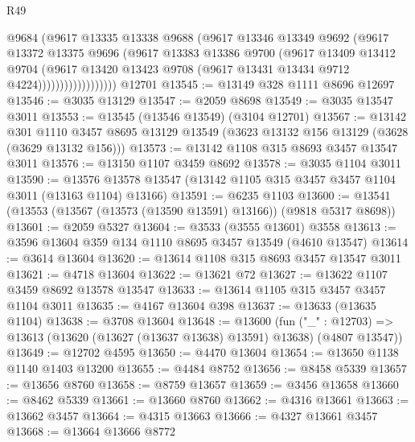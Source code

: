 \begin{lexlean}{R49}
\begin{coremodule}
                          @9684
                          (@9617
                            @13335
                            @13338
                            @9688
                            (@9617
                              @13346
                              @13349
                              @9692
                              (@9617
                                @13372
                                @13375
                                @9696
                                (@9617
                                  @13383
                                  @13386
                                  @9700
                                  (@9617
                                    @13409
                                    @13412
                                    @9704
                                    (@9617
                                      @13420
                                      @13423
                                      @9708
                                      (@9617 @13431 @13434 @9712 @4224))))))))))))))))))
    @12701
@13545 := @13149 @328 @1111 @8696 @12697
@13546 := @3035 @13129
@13547 := @2059 @8698
@13549 := @3035 @13547 @3011
@13553 := @13545 (@13546 @13549) (@3104 @12701)
@13567 := @13142
    @301
    @1110
    @3457
    @8695
    @13129
    @13549
    (@3623 @13132 @156 @13129 (@3628 (@3629 @13132 @156)))
@13573 := @13142 @1108 @315 @8693 @3457 @13547 @3011
@13576 := @13150 @1107 @3459 @8692
@13578 := @3035 @1104 @3011
@13590 := @13576 @13578 @13547 (@13142 @1105 @315 @3457 @3457 @1104 @3011 (@13163 @1104) @13166)
@13591 := @6235 @1103
@13600 := @13541 (@13553 (@13567 (@13573 (@13590 @13591) @13166)) (@9818 @5317 @8698))
@13601 := @2059 @5327
@13604 := @3533 (@3555 @13601) @3558
@13613 := @3596 @13604 @359 @134 @1110 @8695 @3457 @13549 (@4610 @13547)
@13614 := @3614 @13604
@13620 := @13614 @1108 @315 @8693 @3457 @13547 @3011
@13621 := @4718 @13604
@13622 := @13621 @72
@13627 := @13622 @1107 @3459 @8692 @13578 @13547
@13633 := @13614 @1105 @315 @3457 @3457 @1104 @3011
@13635 := @4167 @13604 @398
@13637 := @13633 (@13635 @1104)
@13638 := @3708 @13604
@13648 := @13600
    (fun ("_" : @12703) => @13613 (@13620 (@13627 (@13637 @13638) @13591) @13638) (@4807 @13547))
@13649 := @12702 @4595
@13650 := @4470 @13604
@13654 := @13650 @1138 @1140 @1403 @13200
@13655 := @4484 @8752
@13656 := @8458 @5339
@13657 := @13656 @8760
@13658 := @8759 @13657
@13659 := @3456 @13658
@13660 := @8462 @5339
@13661 := @13660 @8760
@13662 := @4316 @13661
@13663 := @13662 @3457
@13664 := @4315 @13663
@13666 := @4327 @13661 @3457
@13668 := @13664 @13666 @8772

\end{coremodule}
\end{lexlean}
